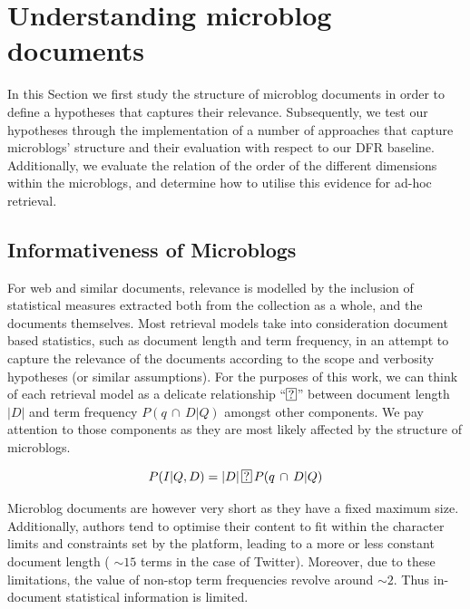 \section{Understanding microblog documents}

\label{discussion}

In this Section we first study the structure of microblog documents in order to define a hypotheses that captures their relevance. Subsequently, we test our hypotheses through the implementation of a number of approaches that capture microblogs' structure and their evaluation with respect to our DFR baseline. Additionally, we evaluate the relation of the order of the different dimensions within the microblogs, and determine how to utilise this evidence for ad-hoc retrieval.

\subsection{Informativeness of Microblogs}


For web and similar documents, relevance is modelled by the inclusion of statistical measures extracted both from the collection as a whole, and the documents themselves. Most retrieval models take into consideration document based statistics, such as document length and term frequency, in an attempt to capture the relevance of the documents according to the scope and verbosity hypotheses (or similar assumptions). For the purposes of this work, we can think of each retrieval model as a delicate relationship ``\(\circled{?}\)'' between document length \(|D|\) and term frequency \( P(q\, \cap\, D | Q)\) amongst other components. We pay attention to those components as they are most likely affected by the structure of microblogs.



\begin{equation}
 P(I|Q,D) = |D|\, \circled{?}\, P(q\, \cap\, D | Q)
  \vspace{0.5cm}
\end{equation}



Microblog documents are however very short as they have a fixed maximum size. Additionally, authors tend to optimise their content to fit within the character limits and constraints set by the platform, leading to a more or less constant document length ( \(\sim15\) terms in the case of Twitter). Moreover, due to these limitations, the value of non-stop term frequencies revolve around \(\sim2\). Thus in-document statistical information is limited.

